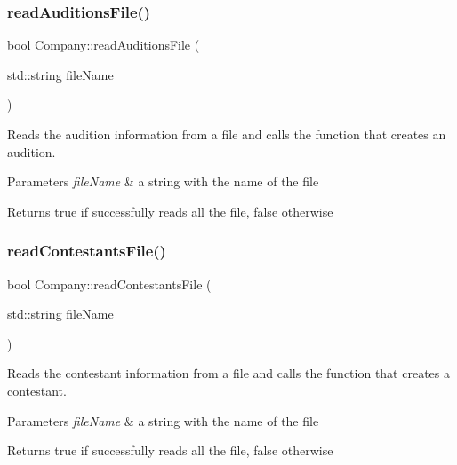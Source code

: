 \subsubsection{\texorpdfstring{read\+Auditions\+File()}{readAuditionsFile()}}
{\footnotesize\ttfamily bool Company\+::read\+Auditions\+File (\begin{DoxyParamCaption}\item[{std\+::string}]{file\+Name }\end{DoxyParamCaption})}



Reads the audition information from a file and calls the function that creates an audition. 


\begin{DoxyParams}{Parameters}
{\em file\+Name} & a string with the name of the file \\
\hline
\end{DoxyParams}
\begin{DoxyReturn}{Returns}
true if successfully reads all the file, false otherwise 
\end{DoxyReturn}
\mbox{\label{class_company_af5f148bc24f2d7d74f2c4ada055bad64}} 
\subsubsection{\texorpdfstring{read\+Contestants\+File()}{readContestantsFile()}}
{\footnotesize\ttfamily bool Company\+::read\+Contestants\+File (\begin{DoxyParamCaption}\item[{std\+::string}]{file\+Name }\end{DoxyParamCaption})}



Reads the contestant information from a file and calls the function that creates a contestant. 


\begin{DoxyParams}{Parameters}
{\em file\+Name} & a string with the name of the file \\
\hline
\end{DoxyParams}
\begin{DoxyReturn}{Returns}
true if successfully reads all the file, false otherwise 
\end{DoxyReturn}
\mbox{\label{class_company_a5c53dbd29fab7972acbb7e92eeee2ee5}} 
